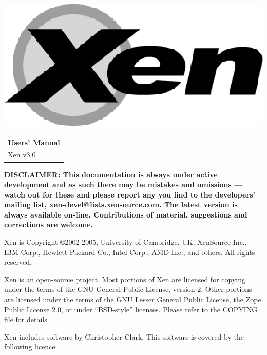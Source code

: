 \documentclass[11pt,twoside,final,openright]{report}
\begin{document}
\pagestyle{empty}
\begin{center}
\vspace*{\fill}
\includegraphics{figs/xenlogo.eps}
\vfill
\vfill
\vfill
\begin{tabular}{l}
{\Huge \bf Users' Manual} \\[4mm]
{\huge Xen v3.0} \\[80mm]
\end{tabular}
\end{center}

{\bf DISCLAIMER: This documentation is always under active development
and as such there may be mistakes and omissions --- watch out for
these and please report any you find to the developers' mailing list,
xen-devel@lists.xensource.com. The latest version is always available
on-line. Contributions of material, suggestions and corrections are
welcome.}

\vfill
\clearpage


\pagestyle{empty}

\vspace*{\fill}

Xen is Copyright \copyright  2002-2005, University of Cambridge, UK, XenSource
Inc., IBM Corp., Hewlett-Packard Co., Intel Corp., AMD Inc., and others.  All
rights reserved.

Xen is an open-source project.  Most portions of Xen are licensed for copying
under the terms of the GNU General Public License, version 2.  Other portions
are licensed under the terms of the GNU Lesser General Public License, the
Zope Public License 2.0, or under ``BSD-style'' licenses.  Please refer to the
COPYING file for details.

Xen includes software by Christopher Clark.  This software is covered by the
following licence:
\end{document}

